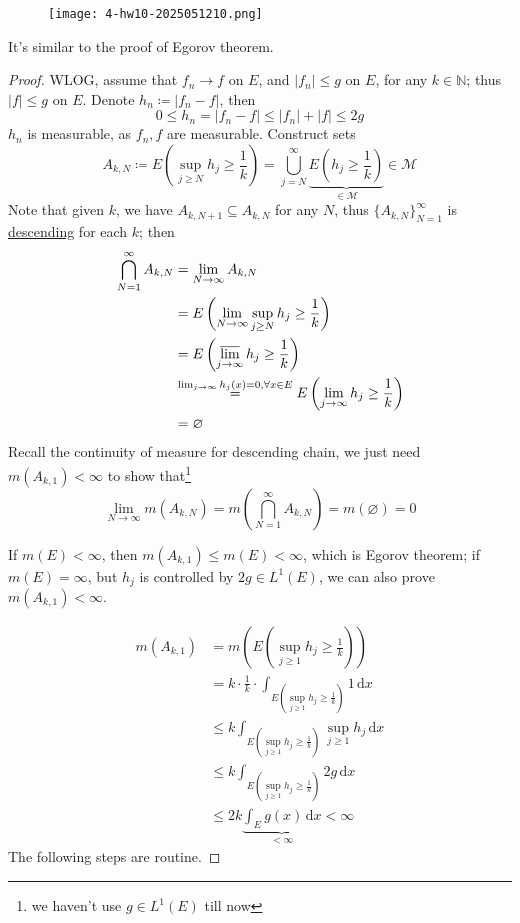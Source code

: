 \begin{exercise}
\begin{figure}[H]
\centering
\texttt{[image: 4-hw10-2025051210.png]}
\label{}
\end{figure}
\end{exercise}
\begin{note}
It's similar to the proof of Egorov theorem.
\end{note}
\begin{proof}
WLOG, assume that $f_n\to f$ on $E$, and $\lvert f_n \rvert\leq g$ on $E$, for any $k\in \mathbb{N}$; thus $\lvert f \rvert\leq g$ on $E$. Denote $h_n\coloneqq \lvert f_n-f \rvert$, then
\[
0\leq h_n=\lvert f_n-f \rvert \leq \lvert f_n \rvert +\lvert f \rvert \leq 2g
\]
$h_n$ is measurable, as $f_n,f$ are measurable. Construct sets
\[
A_{k,N}\coloneqq E\left( \sup_{j\geq N}h_j\geq \frac{1}{k} \right)=\bigcup_{j=N}^{\infty} \underbrace{ E\left( h_j\geq \frac{1}{k} \right) }_{ \in \mathcal{M} }\in \mathcal{M}
\]
Note that given $k$, we have $A_{k,N+1}\subseteq A_{k,N}$ for any $N$, thus $\{ A_{k,N} \}_{N=1}^{\infty}$ is \underline{descending} for each $k$; then
\[
\begin{aligned}
\bigcap_{N=1}^{\infty} A_{k,N} & =\lim_{ N \to \infty } A_{k,N} \\
 & =E\left( \lim_{ N \to \infty } \sup_{j\geq N}h_j\geq \frac{1}{k} \right) \\
 & =E\left( \varlimsup_{ j \to \infty } h_j\geq \frac{1}{k} \right) \\
 & \overset{ \lim_{ j \to \infty } h_j(x)=0,\forall x\in E }{ = }E\left( \lim_{ j \to \infty }h_j\geq \frac{1}{k}  \right) \\
 & =\varnothing
\end{aligned}
\]
Recall the continuity of measure for descending chain, we just need $m(A_{k,1})<\infty$ to show that\footnote{we haven't use  $g\in L^{1}(E)$ till now}
\[
\lim_{ N \to \infty } m(A_{k,N})=m\left( \bigcap_{N=1}^{\infty}A_{k,N}  \right)=m(\varnothing)=0
\]
\begin{note}
If $m(E)<\infty$, then $m(A_{k,1})\leq m(E)<\infty$, which is Egorov theorem; if $m(E)=\infty$, but $h_j$ is controlled by $2g\in L^{1}(E)$, we can also prove $m(A_{k,1})<\infty$.
\end{note}
\[
\begin{aligned}
m(A_{k,1}) & =m\left( E\left( \sup_{j\geq 1}h_j\geq \frac{1}{k} \right) \right) \\
 & =k\cdot\frac{1}{k}\cdot \int_{E\left( \sup_{j\geq 1}h_j\geq \frac{1}{k} \right)}^{} 1 \, \mathrm{d}x  \\
 & \leq k \int_{E\left( \sup_{j\geq 1}h_j\geq \frac{1}{k} \right)}^{} \sup_{j\geq 1}h_j \, \mathrm{d}x  \\
 & \leq k\int_{E\left( \sup_{j\geq 1}h_j\geq \frac{1}{k} \right)}^{} 2g \, \mathrm{d}x \\
 & \leq 2k\underbrace{ \int_{E}^{} g(x) \, \mathrm{d}x }_{ <\infty } <\infty
\end{aligned}
\]
The following steps are routine.


\end{proof}

